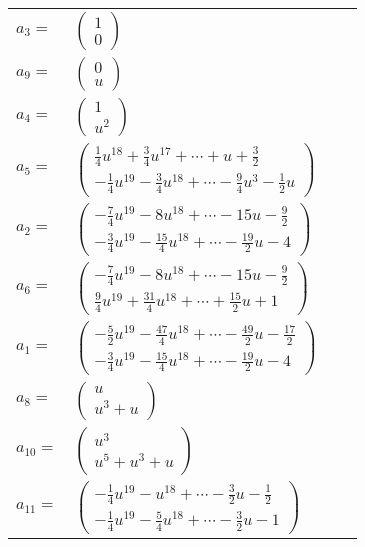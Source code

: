 \documentclass[1p]{elsarticle_modified}
\theoremstyle{definition}
\begin{document}
\begin{tabular}{m{7pt} m{180pt} m{7pt} m{180pt} }
\flushright $a_{3}=$&$\begin{pmatrix}1\\0\end{pmatrix}$ \\
\flushright $a_{9}=$&$\begin{pmatrix}0\\u\end{pmatrix}$ \\
\flushright $a_{4}=$&$\begin{pmatrix}1\\u^2\end{pmatrix}$ \\
\flushright $a_{5}=$&$\begin{pmatrix}\frac{1}{4} u^{18}+\frac{3}{4} u^{17}+\cdots+u+\frac{3}{2}\\-\frac{1}{4} u^{19}-\frac{3}{4} u^{18}+\cdots-\frac{9}{4} u^3-\frac{1}{2} u\end{pmatrix}$ \\
\flushright $a_{2}=$&$\begin{pmatrix}-\frac{7}{4} u^{19}-8 u^{18}+\cdots-15 u-\frac{9}{2}\\-\frac{3}{4} u^{19}-\frac{15}{4} u^{18}+\cdots-\frac{19}{2} u-4\end{pmatrix}$ \\
\flushright $a_{6}=$&$\begin{pmatrix}-\frac{7}{4} u^{19}-8 u^{18}+\cdots-15 u-\frac{9}{2}\\\frac{9}{4} u^{19}+\frac{31}{4} u^{18}+\cdots+\frac{15}{2} u+1\end{pmatrix}$ \\
\flushright $a_{1}=$&$\begin{pmatrix}-\frac{5}{2} u^{19}-\frac{47}{4} u^{18}+\cdots-\frac{49}{2} u-\frac{17}{2}\\-\frac{3}{4} u^{19}-\frac{15}{4} u^{18}+\cdots-\frac{19}{2} u-4\end{pmatrix}$ \\
\flushright $a_{8}=$&$\begin{pmatrix}u\\u^3+u\end{pmatrix}$ \\
\flushright $a_{10}=$&$\begin{pmatrix}u^3\\u^5+u^3+u\end{pmatrix}$ \\
\flushright $a_{11}=$&$\begin{pmatrix}-\frac{1}{4} u^{19}- u^{18}+\cdots-\frac{3}{2} u-\frac{1}{2}\\-\frac{1}{4} u^{19}-\frac{5}{4} u^{18}+\cdots-\frac{3}{2} u-1\end{pmatrix}$ \\

\end{tabular}
\end{document}
